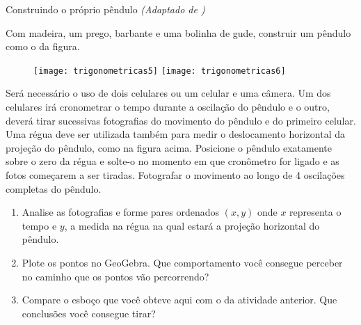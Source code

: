\begin{task}{Construindo o próprio pêndulo}
\textit{(Adaptado de \cite{costa2017})}
\label{trig-ativ2}

Com madeira, um prego, barbante e uma bolinha de gude, construir um pêndulo como o da figura. 

\begin{figure}[H]
\centering

\texttt{[image: trigonometricas5]}
\texttt{[image: trigonometricas6]}

\caption{\cite{costa2017}}
\end{figure}

Será necessário o uso de dois celulares ou um celular e uma câmera. Um dos celulares irá cronometrar o tempo durante a oscilação do pêndulo e o outro, deverá tirar sucessivas fotografias do movimento do pêndulo e do primeiro celular. Uma régua deve ser utilizada também para medir o deslocamento horizontal da projeção do pêndulo, como na figura acima. Posicione o pêndulo exatamente sobre o zero da régua e solte-o no momento em que cronômetro for ligado e as fotos começarem a ser tiradas. Fotografar o movimento ao longo de 4 oscilações completas do pêndulo.

\begin{enumerate}
\item Analise as fotografias e forme pares ordenados $(x,y)$ onde $x$ representa o tempo e $y$, a medida na régua na qual estará a projeção horizontal do pêndulo.

\item Plote os pontos no GeoGebra. Que comportamento você consegue perceber no caminho que os pontos vão percorrendo?
\item Compare o esboço que você obteve aqui com o da atividade anterior. Que conclusões você consegue tirar?
\end{enumerate}


\end{task}


